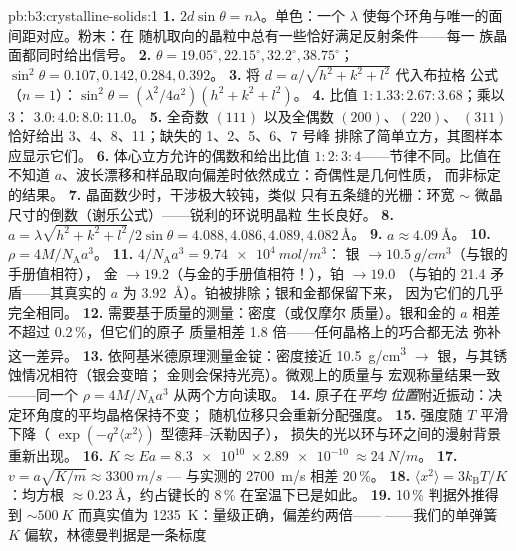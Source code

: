 \begin{solution}{pb:b3:crystalline-solids:1}
\textbf{1.} $2d\sin\theta = n\lambda$。单色：一个
$\lambda$ 使每个环角与唯一的面间距对应。粉末：在
随机取向的晶粒中总有一些恰好满足反射条件——每一
族晶面都同时给出信号。
\textbf{2.} $\theta = 19.05^\circ, 22.15^\circ, 32.2^\circ,
38.75^\circ$；$\sin^2\theta = 0.107, 0.142, 0.284, 0.392$。
\textbf{3.} 将 $d = a/\sqrt{h^2+k^2+l^2}$ 代入布拉格
公式（$n = 1$）：$\sin^2\theta = (\lambda^2/4a^2)(h^2+k^2+l^2)$。
\textbf{4.} 比值 $1 : 1.33 : 2.67 : 3.68$；乘以 3：
$3.0 : 4.0 : 8.0 : 11.0$。
\textbf{5.} 全奇数 $(111)$ 以及全偶数 $(200)$、$(220)$、
$(311)$ 恰好给出 3、4、8、11；缺失的 1、2、5、6、7 号峰
排除了简单立方，其图样本应显示它们。
\textbf{6.} 体心立方允许的偶数和给出比值
$1:2:3:4$——节律不同。比值在不知道
$a$、波长漂移和样品取向偏差时依然成立：奇偶性是几何性质，
而非标定的结果。
\textbf{7.} 晶面数少时，干涉极大较钝，类似
只有五条缝的光栅：环宽 $\sim$ 微晶
尺寸的倒数（谢乐公式）——锐利的环说明晶粒
生长良好。
\textbf{8.} $a = \lambda\sqrt{h^2+k^2+l^2}/2\sin\theta = 4.088,
4.086, 4.089, 4.082\,\unit{\angstrom}$。
\textbf{9.} $a \approx \qty{4.09}{\angstrom}$。
\textbf{10.} $\rho = 4M/N_{\text{A}}a^3$。
\textbf{11.} $4/N_{\text{A}}a^3 = \qty{9.74e4}{mol/m^3}$：
银 $\to \qty{10.5}{g/cm^3}$（与银的手册值相符），
金 $\to 19.2$（与金的手册值相符！），铂 $\to 19.0$
（与铂的 21.4 矛盾——其真实的 $a$ 为
\qty{3.92}{\angstrom}）。铂被排除；银和金都保留下来，
因为它们的几乎完全相同。
\textbf{12.} 需要基于质量的测量：密度（或仅摩尔
质量）。银和金的 $a$ 相差不超过 0.2\,\%，但它们的原子
质量相差 1.8 倍——任何晶格上的巧合都无法
弥补这一差异。
\textbf{13.} 依阿基米德原理测量金锭：密度接近 \qty{10.5}{g/cm^3}
$\to$ 银，与其锈蚀情况相符（银会变暗；
金则会保持光亮）。微观上的质量与
宏观称量结果一致——同一个
$\rho = 4M/N_{\text{A}}a^3$ 从两个方向读取。
\textbf{14.} 原子在\emph{平均
位置}附近振动：决定环角度的平均晶格保持不变；
随机位移只会重新分配强度。
\textbf{15.} 强度随 $T$ 平滑下降（
$\exp(-q^2\langle x^2\rangle)$ 型德拜–沃勒因子），
损失的光以环与环之间的漫射背景重新出现。
\textbf{16.} $K \approx Ea = \qty{8.3e10}{}\times
\qty{2.89e-10}{} \approx \qty{24}{N/m}$。
\textbf{17.} $v = a\sqrt{K/m} \approx \qty{3300}{m/s}$ ---
与实测的 \qty{2700}{m/s} 相差 20\,\%。
\textbf{18.} $\langle x^2\rangle = 3k_{\text{B}}T/K$：均方根
$\approx\qty{0.23}{\angstrom}$，约占键长的 8\,\%
在室温下已是如此。
\textbf{19.} 10\,\% 判据外推得到 $\sim\qty{500}{K}$
而真实值为 \qty{1235}{K}：量级正确，偏差约两倍——
——我们的单弹簧 $K$ 偏软，林德曼判据是一条标度

\end{solution}
